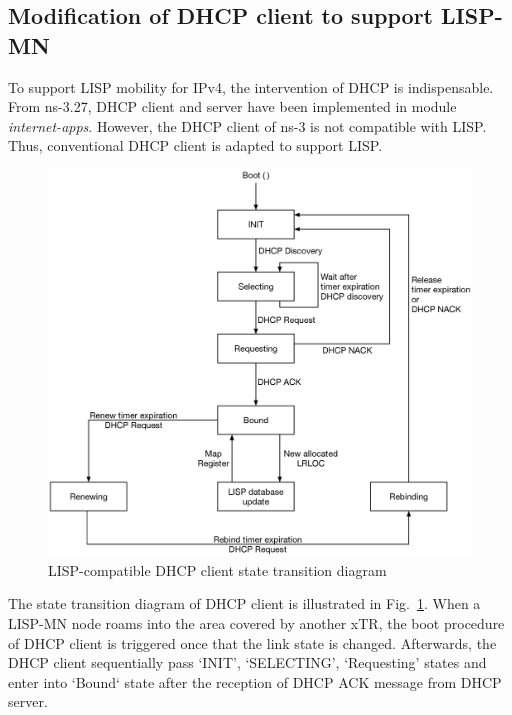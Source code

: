 \subsection{Modification of DHCP client to support LISP-MN}
\label{subsec:DHCP}
To support LISP mobility for IPv4, the intervention of DHCP is indispensable. From ns-3.27, DHCP client and server have been implemented in module \emph{internet-apps}. However, the DHCP client of ns-3 is not compatible with LISP. Thus, conventional DHCP client is adapted to support LISP.
\begin{figure}[!t]
	\centering
	\includegraphics[width=\textwidth]{Pics/DHCP_transition_state.eps}
	\caption{LISP-compatible DHCP client state transition diagram}
	\label{fig:DHCP-state-transition}
\end{figure}
The state transition diagram of DHCP client is illustrated in Fig.~\ref{fig:DHCP-state-transition}. When a LISP-MN node roams into the area covered by another xTR, the boot procedure of DHCP client is triggered once that the link state is changed. Afterwards, the DHCP client sequentially pass `INIT', `SELECTING', `Requesting' states and enter into `Bound` state after the reception of DHCP ACK message from DHCP server.

